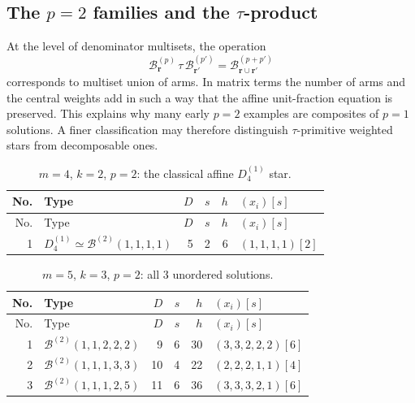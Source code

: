 \documentclass[11pt,a4paper]{article}
\newcommand{\Ber}{\mathcal B}
\theoremstyle{definition}
\theoremstyle{plain}
\begin{document}
\subsection{The \texorpdfstring{$p=2$}{p=2} families and the \texorpdfstring{$\tau$}{tau}-product}

At the level of denominator multisets, the operation
\begin{equation}
        \Ber_{\mathbf r}^{(p)}\,\tau\,\Ber_{\mathbf r'}^{(p')}
        =\Ber_{\mathbf r\cup\mathbf r'}^{(p+p')}
\label{eq:tau-product}
\end{equation}
corresponds to multiset union of arms.  In matrix terms the number of arms and the central weights add in such a way that the affine unit-fraction equation is preserved.  This explains why many early $p=2$ examples are composites of $p=1$ solutions.  A finer classification may therefore distinguish $\tau$-primitive weighted stars from decomposable ones.


\begin{longtable}{@{}r l r r r l@{}}
\caption{$m=4$, $k=2$, $p=2$: the classical affine $D_4^{(1)}$ star.}\label{tab:m4p2}\\
\toprule
No. & Type & $D$ & $s$ & $h$ & $(x_i)[s]$\\
\midrule
\endfirsthead
\toprule
No. & Type & $D$ & $s$ & $h$ & $(x_i)[s]$\\
\midrule
\endhead
1 & $D_4^{(1)}\simeq \Ber^{(2)}(1,1,1,1)$ & 5 & 2 & 6 & $(1,1,1,1)[2]$ \\
\bottomrule
\end{longtable}


\begin{longtable}{@{}r l r r r l@{}}
\caption{$m=5$, $k=3$, $p=2$: all $3$ unordered solutions.}\label{tab:m5p2}\\
\toprule
No. & Type & $D$ & $s$ & $h$ & $(x_i)[s]$\\
\midrule
\endfirsthead
\toprule
No. & Type & $D$ & $s$ & $h$ & $(x_i)[s]$\\
\midrule
\endhead
1 & $\Ber^{(2)}(1,1,2,2,2)$ & 9 & 6 & 30 & $(3,3,2,2,2)[6]$ \\
2 & $\Ber^{(2)}(1,1,1,3,3)$ & 10 & 4 & 22 & $(2,2,2,1,1)[4]$ \\
3 & $\Ber^{(2)}(1,1,1,2,5)$ & 11 & 6 & 36 & $(3,3,3,2,1)[6]$ \\
\bottomrule
\end{longtable}
\end{document}
